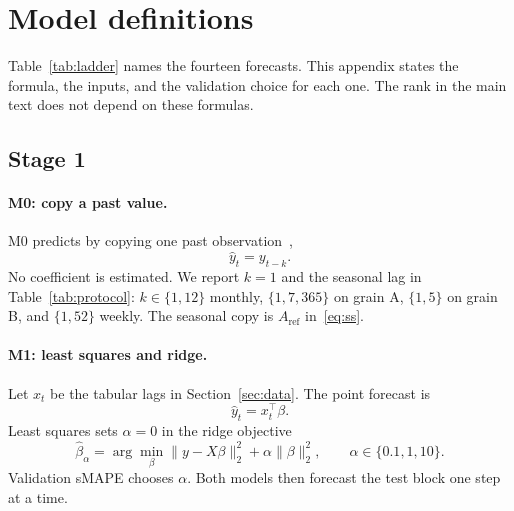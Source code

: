 \begin{table}[ht]
  \caption{Pairwise Wilcoxon signed-rank tests inside each cell.
  Pairs is the number of unordered pairs.
  Significant is the number of pairs whose Benjamini--Hochberg adjusted \(p\)-value is below 0.05.
  Leader beats all is yes only when every pair that includes the sMAPE leader is significant and the median loss differential favours that leader.}
  \label{tab:wilcoxon-pairs}
  \centering
  \scriptsize
  
\end{table}

\section{Model definitions}
\label{app:models}

Table~\ref{tab:ladder} names the fourteen forecasts.
This appendix states the formula, the inputs, and the validation choice for each one.
The rank in the main text does not depend on these formulas.

\subsection{Stage 1}

\paragraph{M0: copy a past value.}
M0 predicts by copying one past observation~\citep{hyndman2021fpp3},
\begin{equation}
  \hat y_t = y_{t-k}.
  \label{eq:m0}
\end{equation}
No coefficient is estimated.
We report $k = 1$ and the seasonal lag in Table~\ref{tab:protocol}: $k \in \{1,12\}$ monthly, $\{1,7,365\}$ on grain A, $\{1,5\}$ on grain B, and $\{1,52\}$ weekly.
The seasonal copy is $A_{\mathrm{ref}}$ in~\eqref{eq:ss}.

\paragraph{M1: least squares and ridge.}
Let $x_t$ be the tabular lags in Section~\ref{sec:data}.
The point forecast is
\begin{equation}
  \hat y_t = x_t^{\top}\beta.
  \label{eq:m1}
\end{equation}
Least squares sets $\alpha = 0$ in the ridge objective~\citep{hoerl1970ridge}
\begin{equation}
  \hat\beta_{\alpha}
  = \arg\min_{\beta}
    \|y - X\beta\|_2^2 + \alpha\|\beta\|_2^2,
  \qquad
  \alpha \in \{0.1, 1, 10\}.
  \label{eq:ridge}
\end{equation}
Validation sMAPE chooses $\alpha$.
Both models then forecast the test block one step at a time.

